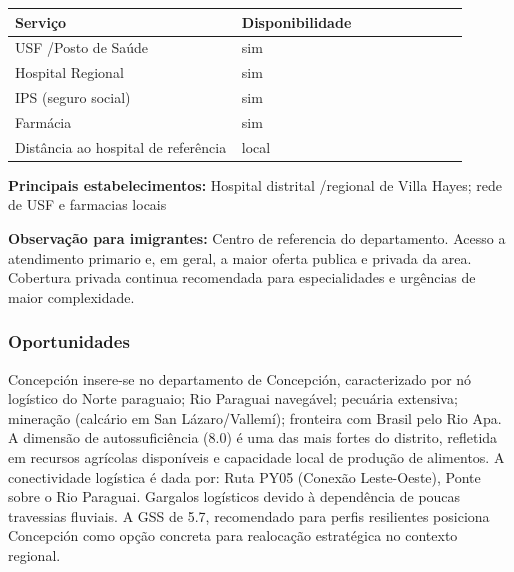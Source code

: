 {\def\LTcaptype{none} %
\begin{longtable}{@{}>{\raggedright\arraybackslash}p{0.45\linewidth} >{\raggedright\arraybackslash}p{0.45\linewidth}@{}}
\toprule\noalign{}
Serviço & Disponibilidade \\
\midrule\noalign{}
\endhead
\bottomrule\noalign{}
\endlastfoot
USF /\allowbreak \allowbreak  Posto de Saúde & sim \\
Hospital Regional & sim \\
IPS (seguro social) & sim \\
Farmácia & sim \\
Distância ao hospital de referência & local \\
\end{longtable}
}

\textbf{Principais estabelecimentos:} Hospital distrital /\allowbreak \allowbreak  regional de
Villa Hayes; rede de USF e farmacias locais

\textbf{Observação para imigrantes:} Centro de referencia do
departamento. Acesso a atendimento primario e, em geral, a maior oferta
publica e privada da area. Cobertura privada continua recomendada para
especialidades e urgências de maior complexidade.
\newpage

\subsubsection*{Oportunidades}\label{oport-concepcion-0101}
Concepción insere-se no departamento de Concepción, caracterizado por nó logístico do Norte paraguaio; Rio Paraguai navegável; pecuária extensiva; mineração (calcário em San Lázaro/Vallemí); fronteira com Brasil pelo Rio Apa. A dimensão de autossuficiência (8.0) é uma das mais fortes do distrito, refletida em recursos agrícolas disponíveis e capacidade local de produção de alimentos. A conectividade logística é dada por: Ruta PY05 (Conexão Leste-Oeste), Ponte sobre o Rio Paraguai. Gargalos logísticos devido à dependência de poucas travessias fluviais. A GSS de 5.7, recomendado para perfis resilientes posiciona Concepción como opção concreta para realocação estratégica no contexto regional.

